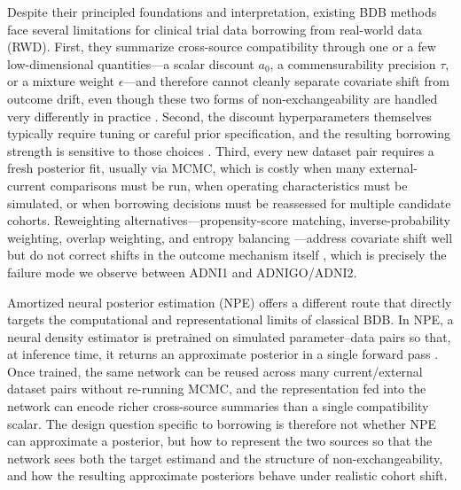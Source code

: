 Despite their principled foundations and interpretation, existing BDB methods face several limitations for clinical trial data borrowing from real-world data (RWD). 
First, they summarize cross-source compatibility through one or a few
low-dimensional quantities---a scalar discount $a_0$, a commensurability
precision $\tau$, or a mixture weight $\epsilon$---and therefore cannot
cleanly separate covariate shift from outcome drift, even though these two
forms of non-exchangeability are handled very differently in practice
\citep{galwey2017supplementation,vanrosmalen2018including}.
Second, the discount hyperparameters themselves typically require tuning or
careful prior specification, and the resulting borrowing strength is
sensitive to those choices \citep{gravestock2017adaptive,viele2014use}.
Third, every new dataset pair requires a fresh posterior fit, usually via
MCMC, which is costly when many external-current comparisons must be run,
when operating characteristics must be simulated, or when borrowing decisions
must be reassessed for multiple candidate cohorts.
Reweighting alternatives---propensity-score matching, inverse-probability
weighting, overlap weighting, and entropy balancing
\citep{rosenbaum1983central,stuart2010matching,li2018balancing,
li2019addressing,hainmueller2012entropy}---address covariate shift well but
do not correct shifts in the outcome mechanism itself
\citep{dahabreh2019generalizing}, which is precisely the failure mode we
observe between ADNI1 and ADNIGO/ADNI2.

Amortized neural posterior estimation (NPE) offers a different route that
directly targets the computational and representational limits of classical BDB.
In NPE, a neural density estimator is pretrained on simulated
parameter--data pairs so that, at inference time, it returns an approximate
posterior in a single forward pass
\citep{papamakarios2016fast,papamakarios2019sequential,greenberg2019automatic,
cranmer2020frontier,lueckmann2021benchmarking,papamakarios2021normalizing}.
Once trained, the same network can be reused across many current/external
dataset pairs without re-running MCMC, and the representation fed into the
network can encode richer cross-source summaries than a single compatibility
scalar.
The design question specific to borrowing is therefore not whether NPE can
approximate a posterior, but how to represent the two sources so that the
network sees both the target estimand and the structure of
non-exchangeability, and how the resulting approximate posteriors behave
under realistic cohort shift.

